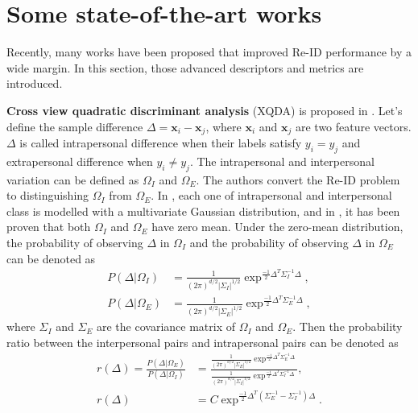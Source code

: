 %

\section{Some state-of-the-art works}
Recently, many works have been proposed that improved Re-ID performance by a wide margin. In this section, those advanced descriptors and metrics are introduced. 

\textbf{Cross view quadratic discriminant analysis} (XQDA) is proposed in \cite{LOMO}. Let's define the sample difference $\Delta = \bm{x}_i - \bm{x}_j$, where $\bm{x}_i $ and $\bm{x}_j$ are two feature vectors. $\Delta$ is called intrapersonal difference when their labels satisfy $y_i = y_j$ and extrapersonal difference when $y_i \ne y_j$. The intrapersonal and interpersonal variation can be defined as $\Omega_I$ and $\Omega_E$. The authors convert the Re-ID problem to distinguishing $\Omega_I$ from $\Omega_E$. In \cite{Bayeface}, each one of intrapersonal and interpersonal class is modelled with a multivariate Gaussian distribution, and in \cite{Bayeface}, it has been proven that both $\Omega_I$ and $\Omega_E$ have zero mean. Under the zero-mean distribution, the probability of observing $\Delta$ in $\Omega_I$ and the probability of observing $\Delta$ in $\Omega_E$ can be denoted as
\begin{equation}
\begin{aligned}
P(\Delta|\Omega_I) &= \frac{1}{(2\pi)^{d/2}|\Sigma_I|^{1/2}}\exp^{\frac{-1}{2}\Delta^T\Sigma_I^{-1}\Delta},\\
P(\Delta|\Omega_E) &= \frac{1}{(2\pi)^{d/2}|\Sigma_E|^{1/2}}\exp^{\frac{-1}{2}\Delta^T\Sigma_E^{-1}\Delta},
\end{aligned}
\end{equation}
where $\Sigma_I$ and $\Sigma_E$ are the covariance matrix of $\Omega_I$ and $\Omega_E$. Then the probability ratio between the interpersonal pairs and intrapersonal pairs can be denoted as
\begin{equation}
\begin{aligned}
r(\Delta) = \frac{P(\Delta|\Omega_E)}{P(\Delta|\Omega_I)}
	   &=\frac{\frac{1}{(2\pi)^{d/2}|\Sigma_E|^{1/2}}\exp^{\frac{-1}{2}\Delta^T\Sigma_E^{-1}\Delta}}{\frac{1}{(2\pi)^{d/2}|\Sigma_I|^{1/2}}\exp^{\frac{-1}{2}\Delta^T\Sigma_I^{-1}\Delta}},\\
r(\Delta)& =  C\exp^{\frac{-1}{2}\Delta^T(\Sigma_E^{-1} - \Sigma_I^{-1})\Delta}.
\end{aligned}
\end{equation}
